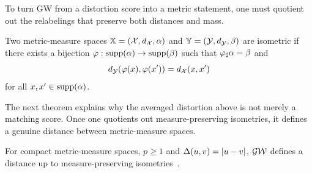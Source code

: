 To turn GW from a distortion score into a metric statement, one must quotient out the relabelings that preserve both distances and mass.

\begin{defn}\label{def-isometric-mm-spaces}
	Two metric-measure spaces $\mathbb{X}=(\mathcal{X},d_{\mathcal{X}},\alpha)$ and $\mathbb{Y}=(\mathcal{Y},d_{\mathcal{Y}},\beta)$ are isometric if there exists a bijection $\varphi:\operatorname{supp}(\alpha)\to\operatorname{supp}(\beta)$ such that $\varphi_\sharp\alpha=\beta$ and
	\[
		d_{\mathcal{Y}}(\varphi(x),\varphi(x'))=d_{\mathcal{X}}(x,x')
	\]
	for all $x,x'\in\operatorname{supp}(\alpha)$.
\end{defn}

The next theorem explains why the averaged distortion above is not merely a matching score. Once one quotients out measure-preserving isometries, it defines a genuine distance between metric-measure spaces.

\begin{thm}\label{thm-gw-metric}
	For compact metric-measure spaces, $p\geq1$ and $\Delta(u,v)=|u-v|$, $\operatorname{\mathcal{GW}}$ defines a distance up to measure-preserving isometries~\cite{memoli-2011}.
\end{thm}

